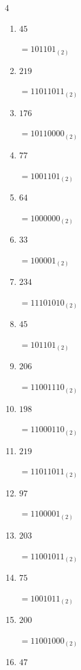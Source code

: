 \begin{multicols}{4}
\begin{enumerate}
        $=11_{(2)}$

  \item $45$

        $=101101_{(2)}$

  \item $219$

        $=11011011_{(2)}$

  \item $176$

        $=10110000_{(2)}$

  \item $77$

        $=1001101_{(2)}$

  \item $64$

        $=1000000_{(2)}$

  \item $33$

        $=100001_{(2)}$

  \item $234$

        $=11101010_{(2)}$

  \item $45$

        $=101101_{(2)}$

  \item $206$

        $=11001110_{(2)}$

  \item $198$

        $=11000110_{(2)}$

  \item $219$

        $=11011011_{(2)}$

\columnbreak %

  \item $97$

        $=1100001_{(2)}$

  \item $203$

        $=11001011_{(2)}$

  \item $75$

        $=1001011_{(2)}$

  \item $200$

        $=11001000_{(2)}$

  \item $47$


\end{enumerate}
\end{multicols}
